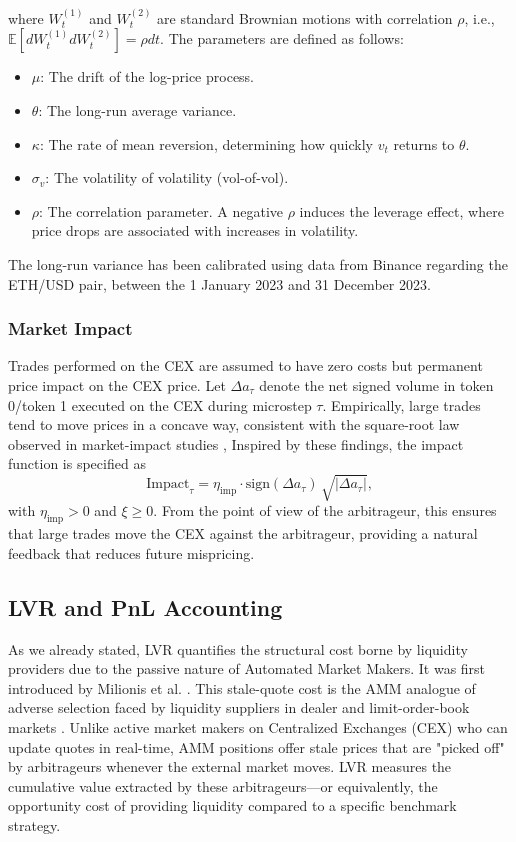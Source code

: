 \documentclass[11pt]{article}
\begin{document}
where $W_t^{(1)}$ and $W_t^{(2)}$ are standard Brownian motions with correlation $\rho$, i.e., $\mathbb{E}[dW_t^{(1)} dW_t^{(2)}] = \rho dt$. The parameters are defined as follows:
\begin{itemize}
    \item $\mu$: The drift of the log-price process.
    \item $\theta$: The long-run average variance.
    \item $\kappa$: The rate of mean reversion, determining how quickly $v_t$ returns to $\theta$.
    \item $\sigma_v$: The volatility of volatility (vol-of-vol).
    \item $\rho$: The correlation parameter. A negative $\rho$ induces the leverage effect, where price drops are associated with increases in volatility.
\end{itemize}
The long-run variance has been calibrated using data from Binance regarding the ETH/USD pair, between the 1 January 2023 and 31 December 2023.

\subsubsection{Market Impact}
\label{subsubsec:impact}
Trades performed on the CEX are assumed to have zero costs but permanent price impact on the CEX price.
Let $\Delta a_\tau$ denote the net signed volume in token 0/token 1 executed on the CEX during microstep $\tau$. Empirically, 
large trades tend to move prices in a concave way, consistent with the square-root law observed in market-impact 
studies \cite{PhysRevX.1.021006,Maitrier03042026}, Inspired by these findings, the impact function is specified as
\begin{equation}
  \mathrm{Impact}_\tau =
  \eta_{\text{imp}} \cdot \mathrm{sign}(\Delta a_\tau)\,\sqrt{\bigl|\Delta a_\tau\bigr|},
  \label{eq:impact}
\end{equation}
with $\eta_{\text{imp}}>0$ and $\xi \geq 0$.
From the point of view of the arbitrageur, this ensures that large trades move the CEX against the arbitrageur, 
providing a natural feedback that reduces future mispricing.

\subsection{LVR and PnL Accounting}
\label{sec:lvr}

As we already stated, LVR quantifies the structural cost borne by liquidity providers due to the passive nature of 
Automated Market Makers. It was first introduced by Milionis et al. \cite{milionis2023}. This stale-quote cost is the AMM analogue of adverse selection faced by liquidity suppliers in dealer and limit-order-book markets \cite{ho1983,avellaneda2008,milionis2023,CARTEA2025105134}. Unlike active market
makers on Centralized Exchanges (CEX) who can update quotes in real-time, AMM positions offer stale prices that 
are "picked off" by arbitrageurs whenever the external market moves. LVR measures the cumulative value extracted 
by these arbitrageurs---or equivalently, the opportunity cost of providing liquidity compared to a specific benchmark 
strategy.
\end{document}
